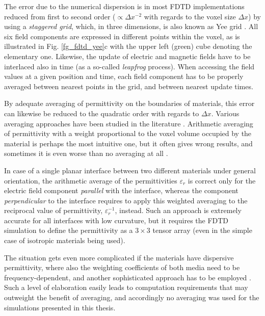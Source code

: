 The error due to the numerical dispersion is in most FDTD implementations reduced from first to second order ($\propto \Delta x^{-2}$ with regards to the voxel size $\Delta x$) by using a \textit{staggered grid}, which, in three dimensions, is also known as Yee grid \cite{yee1966numerical}. All six field components are expressed in different points within the voxel, as is illustrated in Fig. \ref{fg_fdtd_yee}c with the upper left (green) cube denoting the elementary one. 
Likewise, the update of electric and magnetic fields have to be interlaced also in time (as a so-called \textit{leapfrog} process). When accessing the field values at a given position and time, each field component has to be properly averaged between nearest points in the grid, and between nearest update times.

By adequate averaging of permittivity on the boundaries of materials, this error can likewise be reduced to the quadratic order with regards to $\Delta x$. Various averaging approaches have been studied in the literature \cite{oskooi2010meep}. Arithmetic averaging of permittivity with a weight proportional to the voxel volume occupied by the material is perhaps the most intuitive one, but it often gives wrong results, and  sometimes it is even worse than no averaging at all \cite{farjadpour2006improving,deinega2007subpixel}. 

In case of a single planar interface between two different materials under general orientation, the arithmetic average of the permittivities $\varepsilon_r$ is correct only for the electric field component \textit{parallel} with the interface, whereas the component \textit{perpendicular} to the interface requires to apply this weighted averaging to the reciprocal value of permittivity, $\varepsilon_r^{-1}$, instead. Such an approach is extremely accurate for all interfaces with low curvature, but it requires the FDTD simulation to define the permittivity as a $3\times 3$ tensor array (even in the simple case of isotropic materials being used). 

The situation gets even more  complicated if the materials have dispersive permittivity, where also the weighting coefficients of both media need to be frequency-dependent, and another sophisticated approach has to be employed \cite{deinega2007subpixel,hamm2013dispersive}. Such a level of elaboration easily leads to computation requirements that may outweight the benefit of averaging, and accordingly no averaging was used for the simulations presented in this thesis. 

